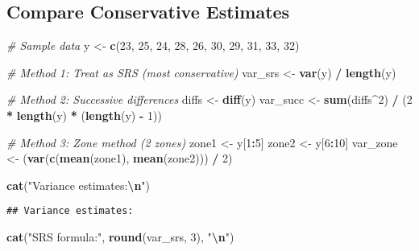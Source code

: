 \documentclass[
]{article}
\newenvironment{Shaded}{\begin{snugshade}}{\end{snugshade}}
\newcommand{\CommentTok}[1]{\textcolor[rgb]{0.56,0.35,0.01}{\textit{#1}}}
\newcommand{\DecValTok}[1]{\textcolor[rgb]{0.00,0.00,0.81}{#1}}
\newcommand{\FunctionTok}[1]{\textcolor[rgb]{0.13,0.29,0.53}{\textbf{#1}}}
\newcommand{\NormalTok}[1]{#1}
\newcommand{\OtherTok}[1]{\textcolor[rgb]{0.56,0.35,0.01}{#1}}
\newcommand{\SpecialCharTok}[1]{\textcolor[rgb]{0.81,0.36,0.00}{\textbf{#1}}}
\newcommand{\StringTok}[1]{\textcolor[rgb]{0.31,0.60,0.02}{#1}}
\begin{document}
\subsection{Compare Conservative
Estimates}\label{compare-conservative-estimates}

\begin{Shaded}
\begin{Highlighting}[]
\CommentTok{\# Sample data}
\NormalTok{y }\OtherTok{\textless{}{-}} \FunctionTok{c}\NormalTok{(}\DecValTok{23}\NormalTok{, }\DecValTok{25}\NormalTok{, }\DecValTok{24}\NormalTok{, }\DecValTok{28}\NormalTok{, }\DecValTok{26}\NormalTok{, }\DecValTok{30}\NormalTok{, }\DecValTok{29}\NormalTok{, }\DecValTok{31}\NormalTok{, }\DecValTok{33}\NormalTok{, }\DecValTok{32}\NormalTok{)}

\CommentTok{\# Method 1: Treat as SRS (most conservative)}
\NormalTok{var\_srs }\OtherTok{\textless{}{-}} \FunctionTok{var}\NormalTok{(y) }\SpecialCharTok{/} \FunctionTok{length}\NormalTok{(y)}

\CommentTok{\# Method 2: Successive differences}
\NormalTok{diffs }\OtherTok{\textless{}{-}} \FunctionTok{diff}\NormalTok{(y)}
\NormalTok{var\_succ }\OtherTok{\textless{}{-}} \FunctionTok{sum}\NormalTok{(diffs}\SpecialCharTok{\^{}}\DecValTok{2}\NormalTok{) }\SpecialCharTok{/}\NormalTok{ (}\DecValTok{2} \SpecialCharTok{*} \FunctionTok{length}\NormalTok{(y) }\SpecialCharTok{*}\NormalTok{ (}\FunctionTok{length}\NormalTok{(y) }\SpecialCharTok{{-}} \DecValTok{1}\NormalTok{))}

\CommentTok{\# Method 3: Zone method (2 zones)}
\NormalTok{zone1 }\OtherTok{\textless{}{-}}\NormalTok{ y[}\DecValTok{1}\SpecialCharTok{:}\DecValTok{5}\NormalTok{]}
\NormalTok{zone2 }\OtherTok{\textless{}{-}}\NormalTok{ y[}\DecValTok{6}\SpecialCharTok{:}\DecValTok{10}\NormalTok{]}
\NormalTok{var\_zone }\OtherTok{\textless{}{-}}\NormalTok{ (}\FunctionTok{var}\NormalTok{(}\FunctionTok{c}\NormalTok{(}\FunctionTok{mean}\NormalTok{(zone1), }\FunctionTok{mean}\NormalTok{(zone2))) }\SpecialCharTok{/} \DecValTok{2}\NormalTok{)}

\FunctionTok{cat}\NormalTok{(}\StringTok{"Variance estimates:}\SpecialCharTok{\textbackslash{}n}\StringTok{"}\NormalTok{)}
\end{Highlighting}
\end{Shaded}

\begin{verbatim}
## Variance estimates:
\end{verbatim}

\begin{Shaded}
\begin{Highlighting}[]
\FunctionTok{cat}\NormalTok{(}\StringTok{"SRS formula:"}\NormalTok{, }\FunctionTok{round}\NormalTok{(var\_srs, }\DecValTok{3}\NormalTok{), }\StringTok{"}\SpecialCharTok{\textbackslash{}n}\StringTok{"}\NormalTok{)}
\end{Highlighting}
\end{Shaded}
\end{document}
